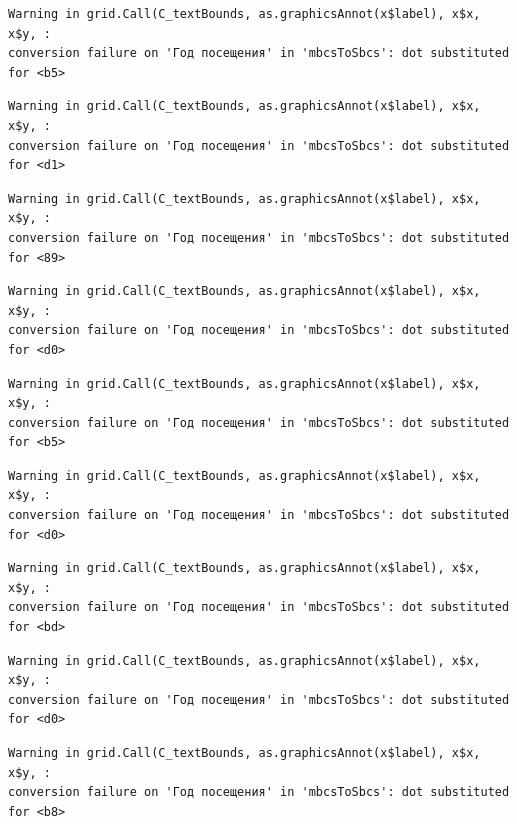 \documentclass[
  letterpaper,
  DIV=11,
  numbers=noendperiod]{scrartcl}
\begin{document}
\begin{verbatim}
Warning in grid.Call(C_textBounds, as.graphicsAnnot(x$label), x$x, x$y, :
conversion failure on 'Год посещения' in 'mbcsToSbcs': dot substituted for <b5>
\end{verbatim}

\begin{verbatim}
Warning in grid.Call(C_textBounds, as.graphicsAnnot(x$label), x$x, x$y, :
conversion failure on 'Год посещения' in 'mbcsToSbcs': dot substituted for <d1>
\end{verbatim}

\begin{verbatim}
Warning in grid.Call(C_textBounds, as.graphicsAnnot(x$label), x$x, x$y, :
conversion failure on 'Год посещения' in 'mbcsToSbcs': dot substituted for <89>
\end{verbatim}

\begin{verbatim}
Warning in grid.Call(C_textBounds, as.graphicsAnnot(x$label), x$x, x$y, :
conversion failure on 'Год посещения' in 'mbcsToSbcs': dot substituted for <d0>
\end{verbatim}

\begin{verbatim}
Warning in grid.Call(C_textBounds, as.graphicsAnnot(x$label), x$x, x$y, :
conversion failure on 'Год посещения' in 'mbcsToSbcs': dot substituted for <b5>
\end{verbatim}

\begin{verbatim}
Warning in grid.Call(C_textBounds, as.graphicsAnnot(x$label), x$x, x$y, :
conversion failure on 'Год посещения' in 'mbcsToSbcs': dot substituted for <d0>
\end{verbatim}

\begin{verbatim}
Warning in grid.Call(C_textBounds, as.graphicsAnnot(x$label), x$x, x$y, :
conversion failure on 'Год посещения' in 'mbcsToSbcs': dot substituted for <bd>
\end{verbatim}

\begin{verbatim}
Warning in grid.Call(C_textBounds, as.graphicsAnnot(x$label), x$x, x$y, :
conversion failure on 'Год посещения' in 'mbcsToSbcs': dot substituted for <d0>
\end{verbatim}

\begin{verbatim}
Warning in grid.Call(C_textBounds, as.graphicsAnnot(x$label), x$x, x$y, :
conversion failure on 'Год посещения' in 'mbcsToSbcs': dot substituted for <b8>
\end{verbatim}
\end{document}

